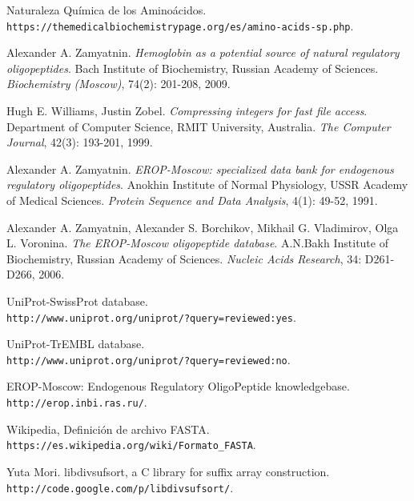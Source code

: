 \documentclass[letterpaper, 10pt, notitlepage]{report}
\newlength{\defbaselineskip}
\newcommand{\singlespacing}{\setlength{\baselineskip}{\defbaselineskip}}
\begin{document}
\begin{thebibliography}{9}
Naturaleza Química de los Aminoácidos.
\\\texttt{https://themedicalbiochemistrypage.org/es/amino-acids-sp.php}.

Alexander A. Zamyatnin.
\textit{Hemoglobin as a potential source of natural regulatory oligopeptides}.
Bach Institute of Biochemistry, Russian Academy of Sciences.
\textit{Biochemistry (Moscow)}, 74(2): 201-208, 2009.

Hugh E. Williams, Justin Zobel.
\textit{Compressing integers for fast file access}.
Department of Computer Science, RMIT University, Australia.
\textit{The Computer Journal}, 42(3): 193-201, 1999.

Alexander A. Zamyatnin.
\textit{EROP-Moscow: specialized data bank for endogenous regulatory oligopeptides}. 
Anokhin Institute of Normal Physiology, USSR Academy of Medical Sciences. 
\textit{Protein Sequence and Data Analysis}, 4(1): 49-52, 1991.

Alexander A. Zamyatnin, Alexander S. Borchikov, Mikhail G. Vladimirov, Olga L. Voronina. 
\textit{The EROP-Moscow oligopeptide database}. 
A.N.Bakh Institute of Biochemistry, Russian Academy of Sciences. 
\textit{Nucleic Acids Research}, 34: D261-D266, 2006.


UniProt-SwissProt database.
\\\texttt{http://www.uniprot.org/uniprot/?query=reviewed:yes}.

UniProt-TrEMBL database.
\\\texttt{http://www.uniprot.org/uniprot/?query=reviewed:no}.

EROP-Moscow: Endogenous Regulatory OligoPeptide knowledgebase.
\\\texttt{http://erop.inbi.ras.ru/}.

Wikipedia, Definición de archivo FASTA.
\\\texttt{https://es.wikipedia.org/wiki/Formato\_FASTA}.

Yuta Mori. libdivsufsort, a C library for suffix array construction.
\\\texttt{http://code.google.com/p/libdivsufsort/}.

\end{thebibliography}

%




\singlespacing
\cleardoublepage
\end{document}
